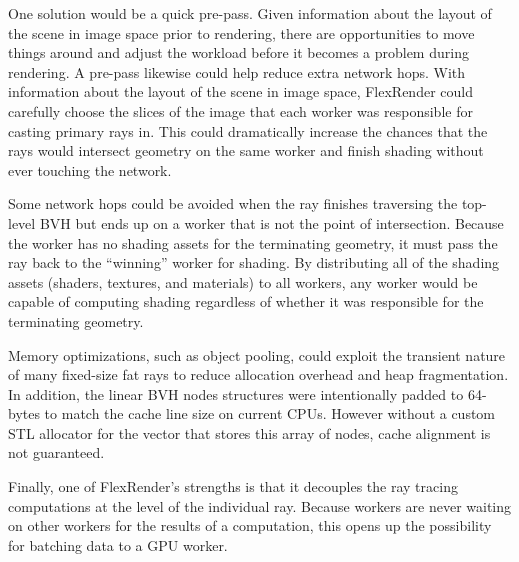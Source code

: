 \documentclass[a4paper,twoside]{article}
\begin{document}
One solution would be a quick pre-pass. Given information about the
layout of the scene in image space prior to rendering, there are opportunities
to move things around and adjust the workload before it becomes a problem
during rendering. A pre-pass likewise could help reduce extra network hops.
With information about the layout of the scene in image space, FlexRender could
carefully choose the slices of the image that each worker was responsible for
casting primary rays in. This could dramatically increase the chances that the
rays would intersect geometry on the same worker and finish shading without
ever touching the network.

Some network hops could be avoided when the ray finishes traversing the
top-level BVH but ends up on a worker that is not the point of intersection.
Because the worker has no shading assets for the terminating geometry, it must
pass the ray back to the ``winning'' worker for shading. By distributing all
of the shading assets (shaders, textures, and materials) to all workers, any
worker would be capable of computing shading regardless of whether it was
responsible for the terminating geometry.

Memory optimizations, such as object pooling, could exploit the transient nature
of many fixed-size fat rays to reduce allocation overhead and heap fragmentation.
In addition, the linear BVH nodes structures were intentionally padded to
64-bytes to match the cache line size on current CPUs. However without a custom
STL allocator for the vector that stores this array of nodes, cache alignment
is not guaranteed.

Finally, one of FlexRender's strengths is that it decouples the ray tracing
computations at the level of the individual ray. Because workers are never
waiting on other workers for the results of a computation, this opens up the
possibility for batching data to a GPU worker.


{\small
}

\vfill
\end{document}

